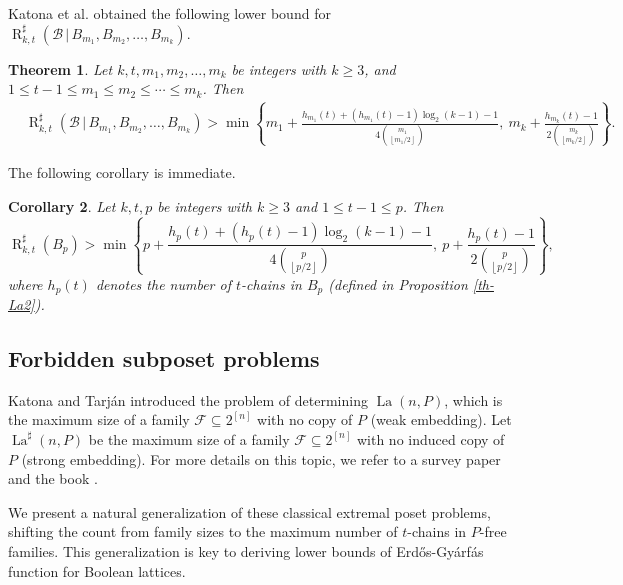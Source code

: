 \documentclass[twoside,12pt]{article}
\newtheorem{theorem}{Theorem}[section]
\newtheorem{corollary}[theorem]{Corollary}
\begin{document}
Katona et al. \cite{KMOW25} obtained the following lower bound for $\operatorname{R}_{k,t}^{\sharp}(\mathcal{B}\,|\,B_{m_1},B_{m_2},\ldots,B_{m_k})$.
\begin{theorem}{\upshape \cite{KMOW25}}\label{th-lower-Boolean}
Let $k,t, m_1, m_2,\ldots,m_k$ be integers with $k\geq 3$,
and $1 \leq t-1 \leq m_1\leq m_2 \leq \cdots \leq m_k$. Then
\begin{equation*}
\begin{split}
&\operatorname{R}_{k,t}^{\sharp}(\mathcal{B}\,|\,B_{m_1},B_{m_2},\ldots,B_{m_k})
>
\min\left\{
m_1 + \frac{h_{m_1}(t) +(h_{m_1}(t)-1)\log_2(k-1) -1}{4{m_{1}\choose\left\lfloor m_{1}/2\right\rfloor}}, \ 
m_k + \frac{h_{m_k}(t) -1}{2{m_{k}\choose\left\lfloor m_{k}/2\right\rfloor}} \right\}.
\end{split}
\end{equation*}
\end{theorem}

The following corollary is immediate.
\begin{corollary}\label{cor-lower-Boolean-uniform}
Let $k,t, p$ be integers with $k\geq 3$ and $1 \leq t-1 \leq p$. Then
\begin{equation*}
\operatorname{R}_{k,t}^{\sharp}(B_p)
> \min\left\{
p + \frac{h_{p}(t) +(h_{p}(t)-1)\log_2(k-1) -1}{4\binom{p}{\left\lfloor p/2\right\rfloor}}, \ 
p + \frac{h_{p}(t) -1}{2\binom{p}{\left\lfloor p/2\right\rfloor}} \right\},
\end{equation*}
where $h_p(t)$ denotes the number of $t$-chains in $B_p$ (defined in Proposition \ref{th-La2}).
\end{corollary}
\subsection{Forbidden subposet problems}
Katona and Tarján \cite{KT83} introduced the problem of determining
$\operatorname{La}(n, P)$, which is the maximum size of a family $\mathcal{F} \subseteq 2^{[n]}$ with no copy of $P$ (weak embedding).
Let
$\operatorname{La}^{\sharp}(n, P)$ be the maximum size of a family $\mathcal{F} \subseteq 2^{[n]}$ with no induced copy of $P$ (strong embedding).
For more details on this topic, we refer to a survey paper \cite{GL15} and the book \cite{GP19}.

We present a natural generalization of these classical extremal poset problems, shifting the count from family sizes to the maximum number of $t$-chains in $P$-free families. This generalization is key to deriving lower bounds of Erd\H{o}s-Gy\'{a}rf\'{a}s function for Boolean lattices.
\end{document}
